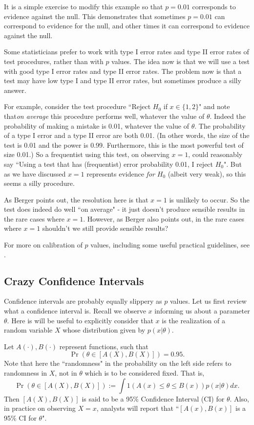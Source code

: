 \documentclass[times,11pt]{article}
\begin{document}
It is a simple exercise to modify this example so that $p=0.01$ corresponds to evidence against the null. 
This demonstrates that sometimes $p=0.01$ can correspond
to evidence for the null, and other times it can correspond to evidence against the null.

Some statisticians prefer to work with type I error rates and type II error rates of test procedures, rather than with $p$ values.
The idea now is that we will use a test with good type I error rates and type II error rates. 
The problem now is that a test may have low type I and type II error rates, but sometimes produce a silly answer.

For example, consider the test procedure ``Reject $H_0$ if $x \in \{1,2\}$" and note that{\it on average} this procedure performs
well, whatever the value of $\theta$. Indeed
the probability of making a mistake is 0.01,
whatever the value of $\theta$. The probability of a type I error and a type II error are both 0.01.
(In other words, the size of the test is 0.01 and the power is 0.99.
Furthermore, this is the most powerful test of size 0.01.)
So a frequentist using this test, on observing $x=1$, could reasonably say ``Using a test that has (frequentist) error probability 0.01, I reject $H_0$".
But  as we have discussed $x=1$ represents evidence {\it for} $H_0$ (albeit very weak), so this seems
a silly procedure.

As Berger points out, the resolution here is that $x=1$ is unlikely to occur. So the test does
indeed do well ``on average" - it just doesn't produce sensible results in the rare cases where $x=1$.
However, as Berger also points out, in the rare cases where $x=1$ shouldn't we still provide sensible results? 

For more on calibration of $p$ values, including some useful practical guidelines, see \cite{sellke2001calibration}.

\subsection*{Crazy Confidence Intervals}

Confidence intervals are probably equally slippery as $p$ values.
Let us first review what a confidence interval is.
Recall we observe $x$ informing us about a parameter $\theta$.
Here is will be useful to explicitly consider that $x$ is the realization of a random variable $X$
whose distribution given by $p(x | \theta)$. 

Let $A(\cdot),B(\cdot)$ represent functions, such that 
\begin{equation}
\Pr(\theta \in [A(X),B(X)]) = 0.95.
\end{equation}
Note that here the ``randomness" in the probability on the left side refers to randomness in $X$, not in $\theta$ which is to be considered fixed.
That is, 
\begin{equation}
\Pr(\theta \in [A(X),B(X)]) := \int 1(A(x) \leq \theta \leq B(x)) p(x | \theta) dx.
\end{equation}
Then $[A(X),B(X)]$ is said to be a 95\% Confidence Interval (CI) for $\theta$.
Also, in practice on observing $X=x$, analysts will report that ``$[A(x),B(x)]$ is a 95\% CI for $\theta$".
\end{document}
